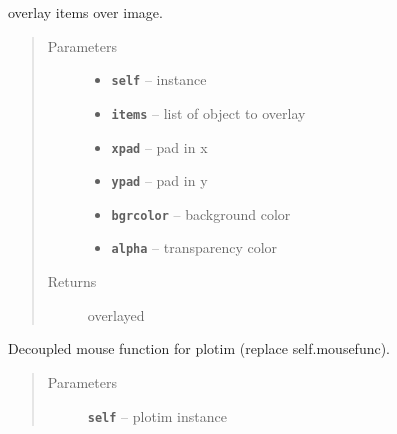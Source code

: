 \documentclass[letterpaper,10pt,english]{sphinxmanual}
\begin{document}
\begin{fulllineitems}
\begin{fulllineitems}
\end{fulllineitems}


\begin{fulllineitems}
\label{RRtoolbox.lib:RRtoolbox.lib.plotter.plotim.makeoverlay}
overlay items over image.
\begin{quote}\begin{description}
\item[{Parameters}] \leavevmode\begin{itemize}
\item {} 
\textbf{\texttt{self}} -- instance

\item {} 
\textbf{\texttt{items}} -- list of object to overlay

\item {} 
\textbf{\texttt{xpad}} -- pad in x

\item {} 
\textbf{\texttt{ypad}} -- pad in y

\item {} 
\textbf{\texttt{bgrcolor}} -- background color

\item {} 
\textbf{\texttt{alpha}} -- transparency color

\end{itemize}

\item[{Returns}] \leavevmode
overlayed

\end{description}\end{quote}

\end{fulllineitems}


\begin{fulllineitems}
\label{RRtoolbox.lib:RRtoolbox.lib.plotter.plotim.mousefunc}
Decoupled mouse function for plotim (replace self.mousefunc).
\begin{quote}\begin{description}
\item[{Parameters}] \leavevmode
\textbf{\texttt{self}} -- plotim instance


\end{description}
\end{quote}
\end{fulllineitems}
\end{fulllineitems}
\end{document}
